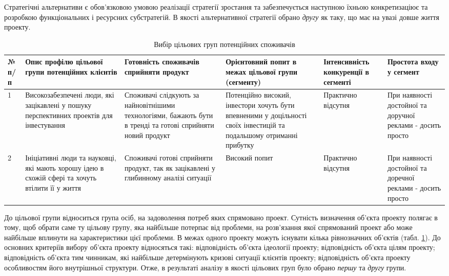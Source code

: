 Стратегічні альтернативи є обов'язковою умовою реалізації стратегії зростання та забезпечується наступною їхньою конкретизаціює та розробкою функціональних і ресурсних субстратегій. В якості альтернативної стратегії обрано \textit{другу} як таку, що має на увазі довше життя проекту.

\begin{table}[H]
\fontsize{12pt}{12pt}\selectfont
	\begin{tabularx}{\textwidth}{|l|X|X|X|X|X|}
    \hline
    № п/п & Опис профілю цільової групи потенційних клієнтів & Готовність споживачів сприйняти продукт & Орієнтовний попит в межах цільової групи (сегменту) & Інтенсивність конкуренції в сегменті & Простота входу у сегмент \\ \hline
    1 & Високозабезпечені люди, які зацікавлені у пошуку перспективних проектів для інвестування & Споживачі слідкують за найновітнішими технологіями, бажають бути в тренді та готові сприйняти новий продукт & Потенційно високий, інвестори хочуть бути впевненими у доцільності своїх інвестицій та подальшому отриманні прибутку & Практично відсутня & При наявності достойної та доручної реклами - досить просто \\ \hline
    2 & Ініціативні люди та науковці, які мають хорошу ідею в схожій сфері та хочуть втілити її у життя & Споживачі готові сприйняти продукт, так як зацікавлені у глибинному аналізі ситуації & Високий попит & Практично відсутня & При наявності достойної та доречної реклами - досить просто \\
    \hline
    \end{tabularx}
\caption{Вибір цільових груп потенційних споживачів} \label{tab:stab_10}
\end{table}

До цільової групи відноситься група осіб, на задоволення потреб яких спрямовано проект. Сутність визначення об'єкта проекту полягає в тому, щоб обрати саме ту цільову групу, яка найбільше потерпає від проблеми, на розв'язання якої спрямований проект або може найбільше вплинути на характеристики цієї проблеми. В межах одного проекту можуть існувати кілька рівнозначних об'єктів (табл. \ref{tab:stab_10}). До основних критеріїв вибору об'єкта проекту відносяться такі: відповідність об'єкта ідеології проекту; відповідність об'єкта цілям проекту; відповідність об'єкта тим чинникам, які найбільше детермінують кризові ситуації клієнтів проекту; відповідність об'єкта проекту особливостям його внутрішньої структури. Отже, в результаті аналізу в якості цільових груп було обрано \textit{першу} та \textit{другу} групи.

